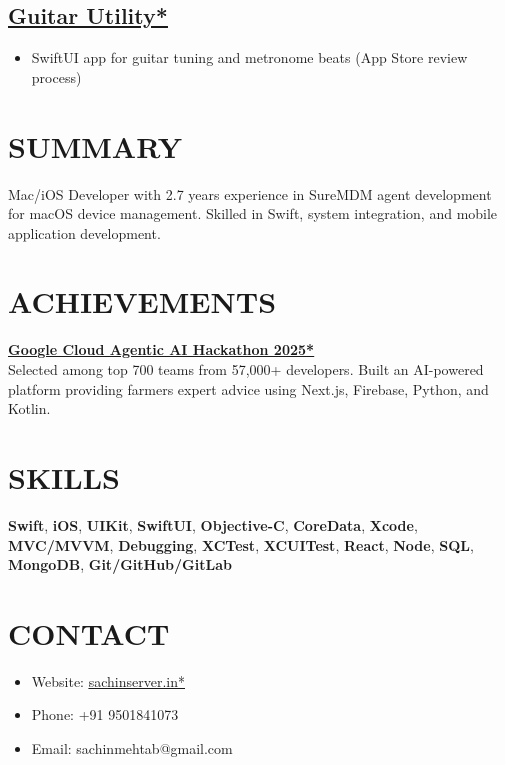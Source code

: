 \documentclass[11pt,a4paper]{moderncv}
\let\oldhref\href
\renewcommand{\href}[2]{\oldhref{#1}{\underline{#2}}}
\begin{document}
\begin{minipage}[t]{0.62\textwidth}
\subsection{\href{https://github.com/sachin6174/Guitar-Utility}{Guitar Utility*}}
\begin{itemize}
    \item SwiftUI app for guitar tuning and metronome beats (App Store review process)
\end{itemize}

\end{minipage}
\hfill
\begin{minipage}[t]{0.35\textwidth}
\section{SUMMARY}
Mac/iOS Developer with 2.7 years experience in SureMDM agent development for macOS device management. Skilled in Swift, system integration, and mobile application development.

\section{ACHIEVEMENTS}
\textbf{\href{https://github.com/abhikumar002/Agentic-Gig-Project}{Google Cloud Agentic AI Hackathon 2025*}} \\
Selected among top 700 teams from 57,000+ developers. Built an AI-powered platform providing farmers expert advice using Next.js, Firebase, Python, and Kotlin.

\section{SKILLS}
\textbf{Swift}, \textbf{iOS}, \textbf{UIKit}, \textbf{SwiftUI}, \textbf{Objective-C}, \textbf{CoreData}, \textbf{Xcode}, \textbf{MVC/MVVM}, \textbf{Debugging}, \textbf{XCTest}, \textbf{XCUITest}, \textbf{React}, \textbf{Node}, \textbf{SQL}, \textbf{MongoDB}, \textbf{Git/GitHub/GitLab}

\section{CONTACT}
\begin{itemize}
    \item Website: \href{https://www.sachinserver.in}{sachinserver.in*}
    \item Phone: +91 9501841073
    \item Email: sachinmehtab@gmail.com
\end{itemize}


\end{minipage}
\end{document}

